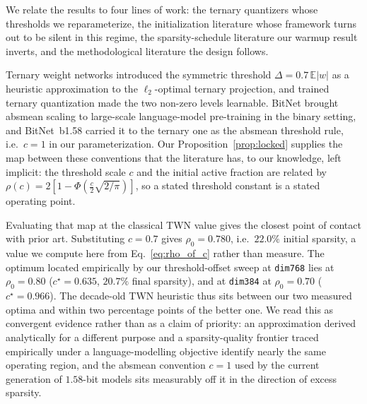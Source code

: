 \documentclass[final,5p,times,twocolumn]{elsarticle}
\theoremstyle{remark}
\newcommand{\E}{\mathbb{E}}
\newcommand{\rhoz}{\rho_{0}}
\begin{document}
We relate the results to four lines of work: the ternary quantizers whose
thresholds we reparameterize, the initialization literature whose framework
turns out to be silent in this regime, the sparsity-schedule literature our
warmup result inverts, and the methodological literature the design follows.

Ternary weight networks
\cite{li2016} introduced the symmetric threshold
$\Delta = 0.7\,\E|w|$ as a heuristic approximation to the $\ell_2$-optimal
ternary projection, and trained ternary quantization \cite{zhu2017a} made
the two non-zero levels learnable. BitNet \cite{wang2023} brought absmean scaling to
large-scale language-model pre-training in the binary setting, and
BitNet~b1.58 \cite{ma2024} carried it to the ternary one as the absmean
threshold rule, i.e.\ $c = 1$ in our parameterization. Our
Proposition~\ref{prop:locked} supplies the map between these conventions that
the literature has, to our knowledge, left implicit: the threshold scale $c$
and the initial active fraction are related by
$\rho(c) = 2[1 - \Phi(\tfrac{c}{2}\sqrt{2/\pi})]$, so a stated threshold
constant is a stated operating point.

Evaluating that map at the classical TWN value gives the closest point of
contact with prior art. Substituting $c = 0.7$ gives
$\rhoz = 0.780$, i.e.\ $22.0\%$ initial sparsity, a value we compute here from
Eq.~\eqref{eq:rho_of_c} rather than measure. The optimum located empirically by
our threshold-offset sweep at \texttt{dim768} lies at $\rhoz = 0.80$
($c^\star = 0.635$, $20.7\%$ final sparsity), and at \texttt{dim384} at
$\rhoz = 0.70$ ($c^\star = 0.966$). The decade-old TWN heuristic thus sits
between our two measured optima and within two percentage points of the better
one. We read this as convergent evidence rather than as a claim of priority:
an approximation derived analytically for a different purpose and a
sparsity-quality frontier traced empirically under a language-modelling
objective identify nearly the same operating region, and the absmean
convention $c = 1$ used by the current generation of $1.58$-bit models sits
measurably off it in the direction of excess sparsity.
\end{document}
